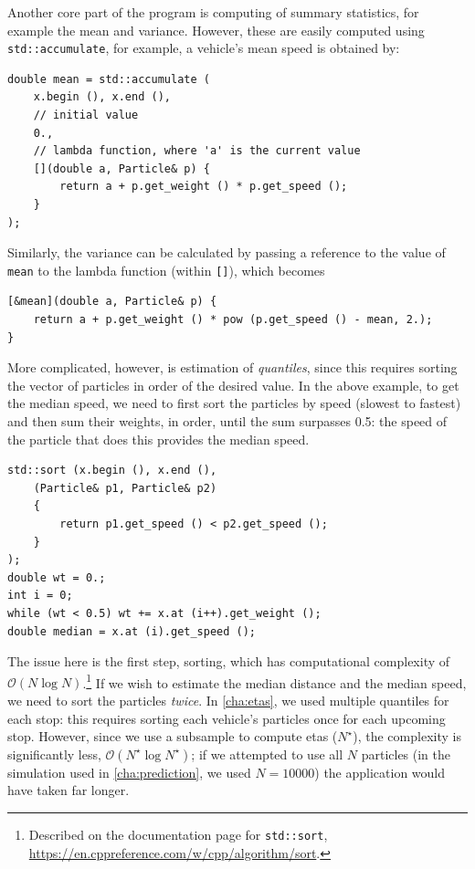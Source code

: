 Another core part of the program is computing of summary statistics, for example the mean and variance. However, these are easily computed using \verb+std::accumulate+, for example, a vehicle's mean speed is obtained by:
\begin{lstlisting}
double mean = std::accumulate (
    x.begin (), x.end (),
    // initial value
    0.,
    // lambda function, where 'a' is the current value
    [](double a, Particle& p) {
        return a + p.get_weight () * p.get_speed ();
    }
);
\end{lstlisting}
Similarly, the variance can be calculated by passing a reference to the value of {\tt mean} to the lambda function (within {\tt []}), which becomes
\begin{lstlisting}
[&mean](double a, Particle& p) {
    return a + p.get_weight () * pow (p.get_speed () - mean, 2.);
}
\end{lstlisting}

More complicated, however, is estimation of \emph{quantiles}, since this requires sorting the vector of particles in order of the desired value. In the above example, to get the median speed, we need to first sort the particles by speed (slowest to fastest) and then sum their weights, in order, until the sum surpasses 0.5: the speed of the particle that does this provides the median speed.
\begin{lstlisting}
std::sort (x.begin (), x.end (),
    (Particle& p1, Particle& p2)
    {
        return p1.get_speed () < p2.get_speed ();
    }
);
double wt = 0.;
int i = 0;
while (wt < 0.5) wt += x.at (i++).get_weight ();
double median = x.at (i).get_speed ();
\end{lstlisting}

The issue here is the first step, sorting, which has computational complexity of $\mathcal{O}(N\log N)$.\footnote{Described on the documentation page for \texttt{std::sort}, \url{https://en.cppreference.com/w/cpp/algorithm/sort}.} If we wish to estimate the median distance and the median speed, we need to sort the particles \emph{twice}. In \cref{cha:etas}, we used multiple quantiles for each stop: this requires sorting each vehicle's particles once for each upcoming stop. However, since we use a subsample to compute \glspl{eta} ($N^\star$), the complexity is significantly less, $\mathcal{O}(N^\star\log N^\star)$; if we attempted to use all $N$ particles (in the simulation used in \cref{cha:prediction}, we used $N=10000$) the application would have taken far longer.



